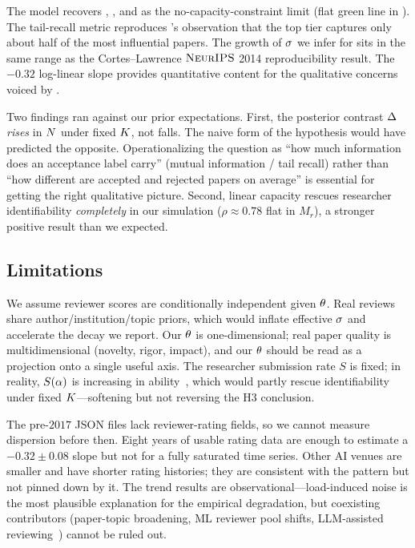  The model recovers \citet{akerlof1970lemons}, \citet{spence1973job}, and \citet{long2023lemons} as the no-capacity-constraint limit (flat green line in ). The tail-recall metric reproduces \citet{heckman2019tyranny}'s observation that the top tier captures only about half of the most influential papers. The growth of $\sigma$ we infer for  sits in the same range as the Cortes--Lawrence $\textsc{NeurIPS}$ 2014 reproducibility result. The $-0.32$ log-linear slope provides quantitative content for the qualitative concerns voiced by \citet{mohanty2025crisis}.

 Two findings ran against our prior expectations. First, the posterior contrast $\Delta$ \emph{rises} in $N$ under fixed $K$, not falls. The naive form of the hypothesis would have predicted the opposite. Operationalizing the question as ``how much information does an acceptance label carry'' (mutual information / tail recall) rather than ``how different are accepted and rejected papers on average'' is essential for getting the right qualitative picture. Second, linear capacity rescues researcher identifiability \emph{completely} in our simulation ($\rho \approx 0.78$ flat in $M_r$), a stronger positive result than we expected.

\subsection{Limitations}
\label{sec:limitations}

 We assume reviewer scores are conditionally independent given $\theta$. Real reviews share author/institution/topic priors, which would inflate effective $\sigma$ and accelerate the decay we report. Our $\theta$ is one-dimensional; real paper quality is multidimensional (novelty, rigor, impact), and our $\theta$ should be read as a projection onto a single useful axis. The researcher submission rate $S$ is fixed; in reality, $S(\alpha)$ is increasing in ability~\citep{kwiek2026topperformers}, which would partly rescue identifiability under fixed $K$---softening but not reversing the H3 conclusion.

 The pre-$2017$ \iclr \openreview JSON files lack reviewer-rating fields, so we cannot measure dispersion before then. Eight years of usable rating data are enough to estimate a $-0.32 \pm 0.08$ slope but not for a fully saturated time series. Other AI venues are smaller and have shorter rating histories; they are consistent with the pattern but not pinned down by it. The trend results are observational---load-induced noise is the most plausible explanation for the empirical degradation, but coexisting contributors (paper-topic broadening, ML reviewer pool shifts, LLM-assisted reviewing~\citep{latona2024lottery}) cannot be ruled out.

